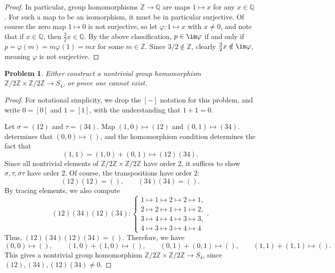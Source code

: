 \documentclass[11pt, letterpaper]{article}
\theoremstyle{plain}
\newtheorem{problem}{Problem}[section]
\begin{document}
\begin{proof}
	In particular, group homomorphisms $\mathbb{Z} \to \mathbb{Q} $ are maps $1\mapsto x$ for any $x\in\mathbb{Q} $. For such a map to be an isomorphism, it must be in particular surjective. Of course the zero map $1\mapsto 0$ is not surjective, so let $\varphi : 1\mapsto x$ with $x\neq 0$, and note that if $x\in\mathbb{Q} $, then $\frac{3}{2} x\in\mathbb{Q} $. By the above classification, $p\in \im \varphi $ if and only if $p=\varphi (m)=m\varphi (1)=mx$ for some $m\in\mathbb{Z} $. Since $3/2 \notin \mathbb{Z} $, clearly $\frac{3}{2} x \notin \im \varphi $, meaning $\varphi $ is not surjective.
\end{proof}

\begin{problem}
	Either construct a nontrivial group homomorphism $\mathbb{Z} /2\mathbb{Z} \times \mathbb{Z} /2\mathbb{Z} \to S_4$, or prove one cannot exist.
\end{problem}
\begin{proof}
	For notational simplicity, we drop the $[-]$ notation for this problem, and write $0=[0]$ and $1=[1]$, with the understanding that $1+1=0$.

	Let $\sigma =(12)$ and $\tau =(34)$. Map $(1,0)\mapsto (12)$ and $(0,1)\mapsto (34)$.  determines that $(0,0)\mapsto ( )$, and the homomorphism condition determines the fact that
	\[
		(1,1) = (1,0)+(0,1)\mapsto (12)(34)
	.\]
	Since all nontrivial elements of $\mathbb{Z} /2\mathbb{Z} \times \mathbb{Z} /2\mathbb{Z} $ have order 2, it suffices to show $\sigma ,\tau ,\sigma \tau $ have order 2. Of course, the transpositions have order 2:
	\[
		(12)(12)=( ),\qquad (34)(34)=( )
	.\]
	By tracing elements, we also compute
	\[
		(12)(34)(12)(34) : 
		\begin{cases}
			1 \mapsto 1 \mapsto 2 \mapsto 2 \mapsto 1,\\
			2\mapsto 2\mapsto 1\mapsto 1\mapsto 2,\\
			3\mapsto 4\mapsto 4\mapsto 3\mapsto 3,\\
			4\mapsto 3\mapsto 3\mapsto 4\mapsto 4
		\end{cases}
	.\]
	Thus, $(12)(34)(12)(34) = ( )$. Therefore, we have
	\[
		(0,0)\mapsto ( ),\qquad (1,0)+(1,0)\mapsto ( ),\qquad (0,1) + (0,1)\mapsto ( ),\qquad (1,1) + (1,1) \mapsto ( )
	.\]
	This gives a nontrivial group homomorphism $\mathbb{Z} /2\mathbb{Z} \times \mathbb{Z} /2\mathbb{Z} \to S_4$, since $(12),(34),(12)(34)\neq 0$.
\end{proof}
\end{document}
